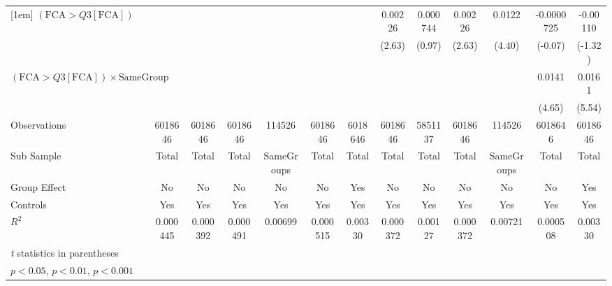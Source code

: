 {\begin{tabular}{l*{12}{c}}
[1em]
 $ (\text{FCA} > Q3[\text{FCA}]) $ &                  &                  &                  &                  &                  &                  &  0.00226\sym{*}  & 0.000744         &  0.00226\sym{*}  &   0.0122\sym{***}&-0.0000725         & -0.00110         \\
                &                  &                  &                  &                  &                  &                  &   (2.63)         &   (0.97)         &   (2.63)         &   (4.40)         &  (-0.07)         &  (-1.32)         \\
[1em]
 $ (\text{FCA} > Q3[\text{FCA}]) \times  {\text{SameGroup} }  $ &                  &                  &                  &                  &                  &                  &                  &                  &                  &                  &   0.0141\sym{***}&   0.0161\sym{***}\\
                &                  &                  &                  &                  &                  &                  &                  &                  &                  &                  &   (4.65)         &   (5.54)         \\
\hline
Observations    &  6018646         &  6018646         &  6018646         &   114526         &  6018646         &  6018646         &  6018646         &  5851137         &  6018646         &   114526         &  6018646         &  6018646         \\
Sub Sample      &    Total         &    Total         &    Total         &SameGroups         &    Total         &    Total         &    Total         &    Total         &    Total         &SameGroups         &    Total         &    Total         \\
Group Effect    &       No         &       No         &       No         &       No         &       No         &      Yes         &       No         &       No         &       No         &       No         &       No         &      Yes         \\
Controls        &      Yes         &      Yes         &      Yes         &      Yes         &      Yes         &      Yes         &      Yes         &      Yes         &      Yes         &      Yes         &      Yes         &      Yes         \\
$ R^2 $         & 0.000445         & 0.000392         & 0.000491         &  0.00699         & 0.000515         &  0.00330         & 0.000372         &  0.00127         & 0.000372         &  0.00721         & 0.000508         &  0.00330         \\
\hline\hline
\multicolumn{13}{l}{\footnotesize \textit{t} statistics in parentheses}\\
\multicolumn{13}{l}{\footnotesize \sym{*} \(p<0.05\), \sym{**} \(p<0.01\), \sym{***} \(p<0.001\)}\\
\end{tabular}
}
